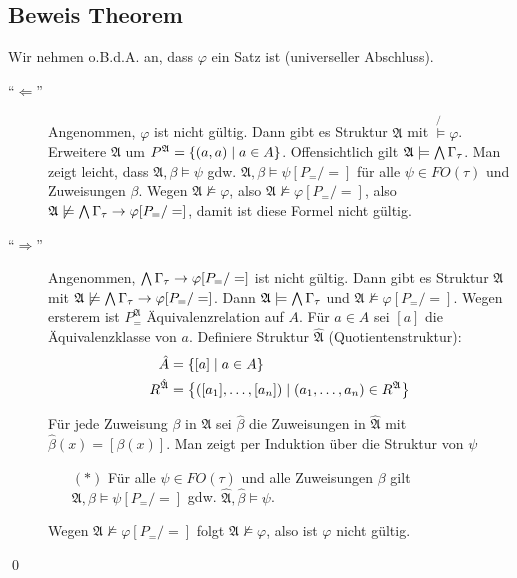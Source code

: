 \subsection{Beweis Theorem}

Wir nehmen o.B.d.A. an, dass $\varphi$ ein Satz ist (universeller Abschluss).

\begin{description}
  \item[\enquote{$\Leftarrow$}]
  Angenommen, $\varphi$ ist nicht gültig. Dann gibt es Struktur $\mathfrak{A}$ mit $\mathfrak\not\models\varphi$.
  Erweitere $\mathfrak{A}$ um $P^\mathfrak{A} = \left\{(a,a)\mid a\in A\right\}$.
  Offensichtlich gilt $\mathfrak{A}\models\operatorname*{\bigwedge}\Gamma_\tau$. Man zeigt leicht, dass $\mathfrak{A},\beta\models\psi$ gdw. $\mathfrak{A},\beta\models\psi[P_=/=]$ für alle $\psi\in FO(\tau)$ und Zuweisungen $\beta$. Wegen $\mathfrak{A}\not\models\varphi$, also $\mathfrak{A}\not\models\varphi[P_=/=]$, also $\mathfrak{A}\not\models\operatorname*{\bigwedge}\Gamma_\tau \rightarrow \varphi[P_=/=]$, damit ist diese Formel nicht gültig.
  
  \item[\enquote{$\Rightarrow$}]
  Angenommen, $\operatorname*{\bigwedge}\Gamma_\tau \rightarrow \varphi[P_=/=]$ ist nicht gültig. Dann gibt es Struktur $\mathfrak{A}$ mit $\mathfrak{A}\not\models\operatorname*{\bigwedge}\Gamma_\tau\rightarrow\varphi[P_=/=]$. Dann $\mathfrak{A}\models\operatorname*{\bigwedge}\Gamma_\tau$ und $\mathfrak{A}\not\models\varphi[P_=/=]$. Wegen ersterem ist $P_=^\mathfrak{A}$ Äquivalenzrelation auf $A$. Für $a\in A$ sei $[a]$ die Äquivalenzklasse von $a$. Definiere Struktur $\hat{\mathfrak{A}}$ (Quotientenstruktur):
  \begin{align*}
    \hat{A} &= \left\{[a] \mid a\in A\right\}\\
    R^{\hat{\mathfrak{A}}} &= \left\{([a_1],\dots,[a_n]) \mid (a_1,\dots,a_n) \in R^\mathfrak{A} \right\}\\
  \end{align*}
  
  Für jede Zuweisung $\beta$ in $\mathfrak{A}$ sei $\hat{\beta}$ die Zuweisungen in $\hat{\mathfrak{A}}$ mit $\hat{\beta}(x)=[\beta(x)]$. Man zeigt per Induktion über die Struktur von $\psi$
  \begin{itemize}
    \item[$(*)$] Für alle $\psi\in FO(\tau)$ und alle Zuweisungen $\beta$ gilt $\mathfrak{A},\beta\models\psi[P_=/=]$ gdw. $\hat{\mathfrak{A}},\hat{\beta}\models\psi$.
  \end{itemize}
  Wegen $\mathfrak{A}\not\models\varphi[P_=/=]$ folgt $\hat{\mathfrak{A}}\not\models\varphi$, also ist $\varphi$ nicht gültig.
\end{description}
\qed
